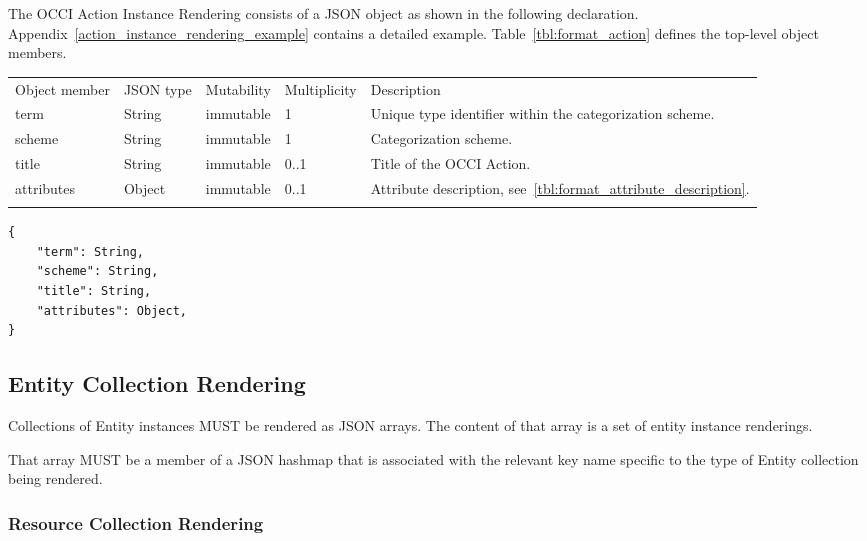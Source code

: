 \documentclass[10pt,a4paper]{article}
\begin{document}
The OCCI Action Instance Rendering consists of a JSON object as shown in the
following declaration. Appendix~\ref{action_instance_rendering_example} contains a detailed example.
Table~\ref{tbl:format_action} defines the top-level object members.

 {
    \begin{tabularx}{\textwidth}{llllX}
    \toprule
    Object member   & JSON type   & Mutability  & Multiplicity  & Description \\
    \colrule
    term            & String      & immutable   & 1             & Unique type identifier within the categorization scheme. \\

    scheme          & String      & immutable   & 1             & Categorization scheme. \\

    title           & String      & immutable   & 0..1          & Title of the OCCI Action. \\

    attributes      & Object      & immutable   & 0..1          & Attribute description, see~\ref{tbl:format_attribute_description}. \\
    \botrule
    \end{tabularx}
}

\begin{lstlisting}
{
    "term": String,
    "scheme": String,
    "title": String,
    "attributes": Object,
}
\end{lstlisting}


\subsection{Entity Collection Rendering}
Collections of Entity instances MUST be rendered as JSON arrays. The content of that array is a set
of entity instance renderings.

That array MUST be a member of a JSON hashmap that is associated with the relevant key name specific
to the type of Entity collection being rendered.

\subsubsection{Resource Collection Rendering}
\end{document}
